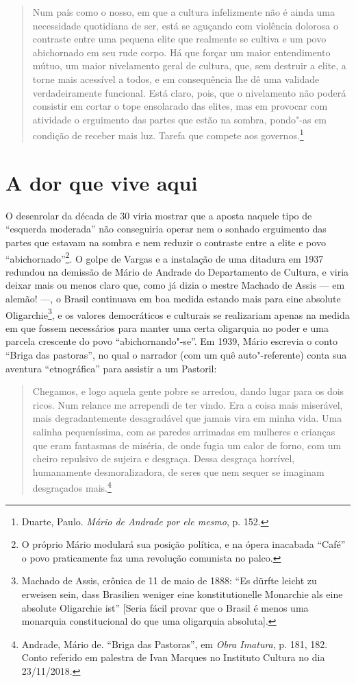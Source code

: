 \begin{quote}
Num país como o nosso, em que a cultura infelizmente não é ainda uma
necessidade quotidiana de ser, está se aguçando com violência dolorosa o
contraste entre uma pequena elite que realmente se cultiva e um povo
abichornado em seu rude corpo. Há que forçar um maior entendimento
mútuo, um maior nivelamento geral de cultura, que, sem destruir a elite,
a torne mais acessível a todos, e em consequência lhe dê uma validade
verdadeiramente funcional. Está claro, pois, que o nivelamento não
poderá consistir em cortar o tope ensolarado das elites, mas em provocar
com atividade o erguimento das partes que estão na sombra, pondo"-as em
condição de receber mais luz. Tarefa que compete aos governos.\footnote{Duarte,
  Paulo. \emph{Mário de Andrade por ele mesmo}, p. 152.}
\end{quote}

\section{A dor que vive aqui}

O desenrolar da década de 30 viria mostrar que a aposta naquele tipo de
``esquerda moderada'' não conseguiria operar nem o sonhado erguimento
das partes que estavam na sombra e nem reduzir o contraste entre a elite
e povo ``abichornado''\footnote{O próprio Mário modulará sua posição
  política, e na ópera inacabada ``Café'' o povo praticamente faz uma
  revolução comunista no palco.}. O golpe de Vargas e a instalação de
uma ditadura em 1937 redundou na demissão de Mário de Andrade do
Departamento de Cultura, e viria deixar mais ou menos claro que, como já
dizia o mestre Machado de Assis --- em alemão! ---, o Brasil continuava em
boa medida estando mais para eine absolute Oligarchie\footnote{Machado
  de Assis, crônica de 11 de maio de 1888: ``Es dürfte leicht zu
  erweisen sein, dass Brasilien weniger eine konstitutionelle Monarchie
  als eine absolute Oligarchie ist'' {[}Seria fácil provar que o Brasil
  é menos uma monarquia constitucional do que uma oligarquia
  absoluta{]}.}, e os valores democráticos e culturais se realizariam
apenas na medida em que fossem necessários para manter uma certa
oligarquia no poder e uma parcela crescente do povo ``abichornando"-se''.
Em 1939, Mário escrevia o conto ``Briga das pastoras'', no qual o
narrador (com um quê auto"-referente) conta sua aventura ``etnográfica''
para assistir a um Pastoril:

\begin{quote}
Chegamos, e logo aquela gente pobre se arredou, dando lugar para os dois
ricos. Num relance me arrependi de ter vindo. Era a coisa mais
miserável, mais degradantemente desagradável que jamais vira em minha
vida. Uma salinha pequeníssima, com as paredes arrimadas em mulheres e
crianças que eram fantasmas de miséria, de onde fugia um calor de forno,
com um cheiro repulsivo de sujeira e desgraça. Dessa desgraça horrível,
humanamente desmoralizadora, de seres que nem sequer se imaginam
desgraçados mais.\footnote{Andrade, Mário de. ``Briga das Pastoras'', em
  \emph{Obra Imatura}, p. 181, 182. Conto referido em palestra de Ivan
  Marques no Instituto  Cultura no dia 23/11/2018.}
\end{quote}

